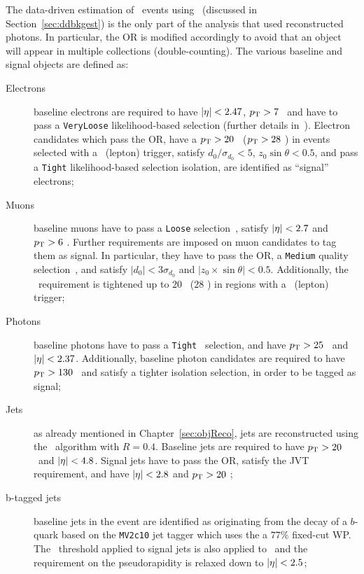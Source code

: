 		The data-driven estimation of \ttZ\ events using \ttgamma\ (discussed in Section~\ref{sec:ddbkgest}) is the only part of the analysis that used reconstructed photons. In particular, the \ac{OR} is modified accordingly to avoid that an object will appear in multiple collections (double-counting). The various baseline and signal objects are defined as:

		\begin{description}
			\item[Electrons] 
				baseline electrons are required to have $|\eta| < 2.47$, $p_{\mathrm{T}} > 7$ \GeV\ and have to pass a \texttt{VeryLoose} likelihood-based selection (further details in~\cite{egamma, egamma2}). Electron candidates which pass the \ac{OR}, have a $p_{\mathrm{T}} > 20$ \gev\ ($p_{\mathrm{T}} > 28$ \GeV) in events selected with a \met\ (lepton) trigger, satisfy $d_0/\sigma_{d_{0}} < 5$, $z_0 \sin \theta < 0.5$, and pass a \texttt{Tight} likelihood-based selection isolation, are identified as ``signal'' electrons;

			\item[Muons] 	
				baseline muons have to pass a \texttt{Loose} selection~\cite{PERF-2015-10}, satisfy $|\eta| < 2.7$ and $p_{\mathrm{T}} > 6$ \GeV. Further requirements are imposed on muon candidates to tag them as signal. In particular, they have to pass the \ac{OR}, a \texttt{Medium} quality selection~\cite{PERF-2015-10}, and satisfy
				$|d_0|< 3 \sigma_{d_0}$ and $|z_0 \times \sin \theta |<0.5$. Additionally, the \pt\ requirement is tightened up to $20$ \gev\ ($28$ \GeV) in regions with a \met\ (lepton) trigger;

			\item[Photons]
				baseline photons have to pass a \texttt{Tight}~\cite{Aaboud:2016yuq} selection, and have $p_{\mathrm{T}} > 25$ \GeV\ and $|\eta| < 2.37$. Additionally, baseline photon candidates are required to have $p_{\mathrm{T}} > 130$ \GeV\ and satisfy a tighter isolation selection, in order to be tagged as signal;
			
			\item[Jets]
				as already mentioned in Chapter~\ref{sec:objReco}, jets are reconstructed using the \antikt\ algorithm with $R=0.4$. Baseline jets are required to have $p_{\mathrm{T}}>20$ \GeV\ and $|\eta|< 4.8$. Signal jets have to pass the \ac{OR}, satisfy the \ac{JVT} requirement, and have $|\eta| < 2.8$ and $p_{\mathrm{T}} > 20$ \GeV;

			\item[b-tagged jets]
				baseline jets in the event are identified as originating from the decay of a $b$-quark based on the \texttt{MV2c10} jet tagger which uses the a $77\%$ fixed-cut WP. The \pt\ threshold applied to signal jets is also applied to \bjs\ and the requirement on the pseudorapidity is relaxed down to $|\eta| < 2.5$;
			

\end{description}
